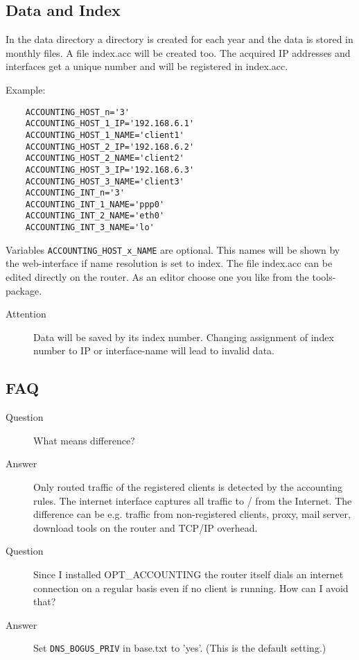 \subsection{Data and Index}
In the data directory a directory is created for each year and the data is
stored in monthly files. A file index.acc will be created too. 
The acquired IP addresses and interfaces get a unique number 
and will be registered in index.acc.

Example:
\begin{example}
\begin{verbatim}
    ACCOUNTING_HOST_n='3'
    ACCOUNTING_HOST_1_IP='192.168.6.1'
    ACCOUNTING_HOST_1_NAME='client1'
    ACCOUNTING_HOST_2_IP='192.168.6.2'
    ACCOUNTING_HOST_2_NAME='client2'
    ACCOUNTING_HOST_3_IP='192.168.6.3'
    ACCOUNTING_HOST_3_NAME='client3'
    ACCOUNTING_INT_n='3'
    ACCOUNTING_INT_1_NAME='ppp0'
    ACCOUNTING_INT_2_NAME='eth0'
    ACCOUNTING_INT_3_NAME='lo'
\end{verbatim}
\end{example}
Variables \verb*?ACCOUNTING_HOST_x_NAME? are optional. This names 
will be shown by the web-interface if name resolution is set to index.
The file index.acc can be edited directly on the router. As an editor 
choose one you like from the tools-package.

\begin{description}
\item[Attention]Data will be saved by its index number. Changing 
assignment of index number to IP or interface-name will lead to 
invalid data.
\end{description}

\subsection{FAQ}
\begin{description}
\item[Question] What means difference?
\item[Answer] Only routed traffic of the registered clients is detected by the 
accounting rules. The internet interface captures all traffic to / from the Internet. 
The difference can be e.g. traffic from non-registered clients, proxy, 
mail server, download tools on the router and TCP/IP overhead.

\end{description}

\begin{description}
\item[Question] Since I installed OPT\_ACCOUNTING the router itself dials an 
internet connection  on a regular basis even if no client is running.
How can I avoid that?
\item[Answer] Set \verb*?DNS_BOGUS_PRIV? in base.txt to 'yes'.
(This is the default setting.)
\end{description}

